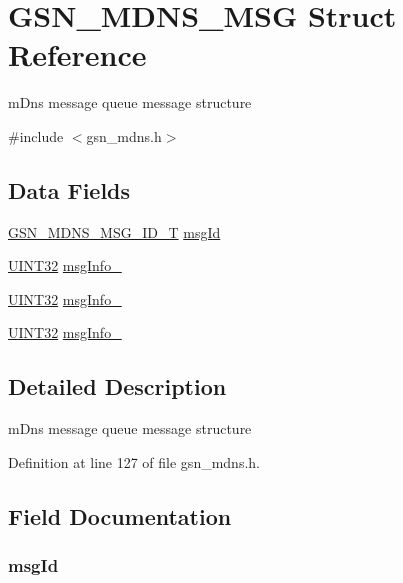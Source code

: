 \hypertarget{a00145}{
\section{GSN\_\-MDNS\_\-MSG Struct Reference}
\label{a00145}
}


mDns message queue message structure  




{\ttfamily \#include $<$gsn\_\-mdns.h$>$}

\subsection*{Data Fields}
\begin{DoxyCompactItemize}
\item 
\hyperlink{a00526_a04683c3770745c022dfa21c6317456a9}{GSN\_\-MDNS\_\-MSG\_\-ID\_\-T} \hyperlink{a00145_a8c15b309d7051108434410ef751ae9b2}{msgId}
\item 
\hyperlink{a00660_gae1e6edbbc26d6fbc71a90190d0266018}{UINT32} \hyperlink{a00145_a88b43728a9e439e9db0c0dc90b89ed51}{msgInfo\_}
\item 
\hyperlink{a00660_gae1e6edbbc26d6fbc71a90190d0266018}{UINT32} \hyperlink{a00145_a35942ac10c01f580e05a7104ea144a0f}{msgInfo\_}
\item 
\hyperlink{a00660_gae1e6edbbc26d6fbc71a90190d0266018}{UINT32} \hyperlink{a00145_a01a9e313a5220b8540652d0f937c28b4}{msgInfo\_}
\end{DoxyCompactItemize}


\subsection{Detailed Description}
mDns message queue message structure 

Definition at line 127 of file gsn\_\-mdns.h.



\subsection{Field Documentation}
\hypertarget{a00145_a8c15b309d7051108434410ef751ae9b2}{
\subsubsection[{msgId}]{ {\bf msgId}}}
\label{a00145_a8c15b309d7051108434410ef751ae9b2}


